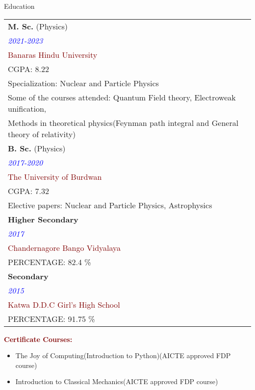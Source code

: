 \begin{rubric}{{\color{Maroon}Education}}
\entry*[]%
	\begin{tabular}{ll}
   \hspace{-0.45cm}\textbf{M. Sc.} (Physics) \\
   \textcolor{blue}{\textit{2021-2023}}\\
   \textcolor{Maroon}{Banaras Hindu University}\\
   
   CGPA: 8.22\\
   Specialization: Nuclear and Particle Physics     \\
   Some of the courses attended: Quantum Field theory, Electroweak unification,\\ Methods in theoretical physics(Feynman path integral and General theory of relativity)\\
   

\hspace{-0.45cm}\textbf{B. Sc.} (Physics)   \\

\textcolor{blue}{\textit{2017-2020}}\\
\textcolor{Maroon}{The University of Burdwan}\\

CGPA: 7.32\\
Elective papers: Nuclear and Particle Physics, Astrophysics\\

\hspace{-0.45cm}\textbf{Higher Secondary} \\

\textcolor{blue}{\textit{2017}}\\
\textcolor{Maroon}{Chandernagore Bango Vidyalaya}\\

PERCENTAGE: 82.4 \% \\

\hspace{-0.45cm}\textbf{Secondary} \\

\textcolor{blue}{\textit{2015}}\\
\textcolor{Maroon}{Katwa D.D.C Girl's High School}\\
PERCENTAGE: 91.75 \% \\
         \end{tabular}

\vspace{1cm}


\hspace{-0.45cm}\textcolor{Maroon}{\textbf{Certificate Courses:}}

\begin{itemize}
    \item The Joy of Computing(Introduction to Python)(AICTE approved FDP course)
    \item Introduction to Classical Mechanics(AICTE approved FDP course)
\end{itemize}

    


	
\end{rubric}